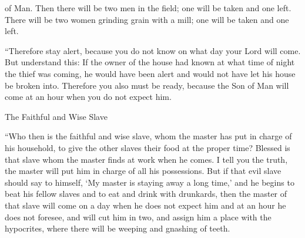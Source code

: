 {of Man.
Then
there will be
two
men in
the field;
one
will be taken
and
one
left.
There will be
two
women grinding grain
with
a mill;
one
will be taken
and
one
left.
\par }{\PP {}“Therefore
stay alert,
because
you do
not
know
on what
day
your
Lord
will come.
But
understand
this: If
the owner of the house
had known
at what
time of night
the thief
was coming,
he would have been alert
and
would
not
have let
his
house
be broken into.
Therefore
you
also
must be
ready,
because
the Son
of Man
will come
at an hour
when you do
not
expect him.
\par }{\SH The Faithful and Wise Slave
\par }{\PP {}“Who
then
is
the faithful
and
wise
slave,
whom
the master
has put in charge
of
his
household,
to give
the other slaves their
food
at
the proper time?
Blessed
is that
slave
whom
the master
finds
at work
when he comes.
I tell
you
the truth,
the master will put
him
in charge
of
all
his
possessions.
But
if
that evil
slave
should say
to
himself, ‘My
master
is staying away a long time,’
and
he begins
to beat
his
fellow slaves
and
to eat
and
drink
with
drunkards,
then the master
of that
slave
will come
on
a day
when he does
not
expect
him and
at
an hour
he does
not
foresee,
and
will cut
him
in two, and
assign
him
a place with
the hypocrites,
where
there
will be
weeping
and
gnashing
of teeth.

}
